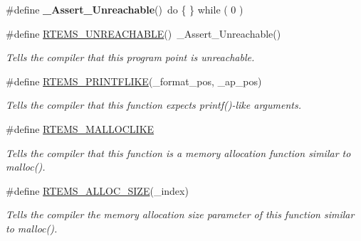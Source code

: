 \begin{DoxyCompactItemize}
\mbox{\label{group__RTEMSScoreBaseDefs_ga4374f3ed41aa840bd894281129e6e075}} 
\#define {\bfseries \+\_\+\+Assert\+\_\+\+Unreachable}()~do \{ \} while ( 0 )
\item 
\mbox{\label{group__RTEMSScoreBaseDefs_ga04fea2851d6376a31527d189ecd2d717}} 
\#define \mbox{\hyperlink{group__RTEMSScoreBaseDefs_ga04fea2851d6376a31527d189ecd2d717}{R\+T\+E\+M\+S\+\_\+\+U\+N\+R\+E\+A\+C\+H\+A\+B\+LE}}()~\+\_\+\+Assert\+\_\+\+Unreachable()
\begin{DoxyCompactList}\small\item\em Tells the compiler that this program point is unreachable. \end{DoxyCompactList}\item 
\mbox{\label{group__RTEMSScoreBaseDefs_gac1811143c580ed4898c9eae63d5c5b8e}} 
\#define \mbox{\hyperlink{group__RTEMSScoreBaseDefs_gac1811143c580ed4898c9eae63d5c5b8e}{R\+T\+E\+M\+S\+\_\+\+P\+R\+I\+N\+T\+F\+L\+I\+KE}}(\+\_\+format\+\_\+pos,  \+\_\+ap\+\_\+pos)
\begin{DoxyCompactList}\small\item\em Tells the compiler that this function expects printf()-\/like arguments. \end{DoxyCompactList}\item 
\mbox{\label{group__RTEMSScoreBaseDefs_gae7c9d466d27577cf40868ba00aaf701e}} 
\#define \mbox{\hyperlink{group__RTEMSScoreBaseDefs_gae7c9d466d27577cf40868ba00aaf701e}{R\+T\+E\+M\+S\+\_\+\+M\+A\+L\+L\+O\+C\+L\+I\+KE}}
\begin{DoxyCompactList}\small\item\em Tells the compiler that this function is a memory allocation function similar to malloc(). \end{DoxyCompactList}\item 
\mbox{\label{group__RTEMSScoreBaseDefs_ga482bcf1248a09afc679fc1d56c16343d}} 
\#define \mbox{\hyperlink{group__RTEMSScoreBaseDefs_ga482bcf1248a09afc679fc1d56c16343d}{R\+T\+E\+M\+S\+\_\+\+A\+L\+L\+O\+C\+\_\+\+S\+I\+ZE}}(\+\_\+index)
\begin{DoxyCompactList}\small\item\em Tells the compiler the memory allocation size parameter of this function similar to malloc(). \end{DoxyCompactList}\item 

\end{DoxyCompactItemize}
